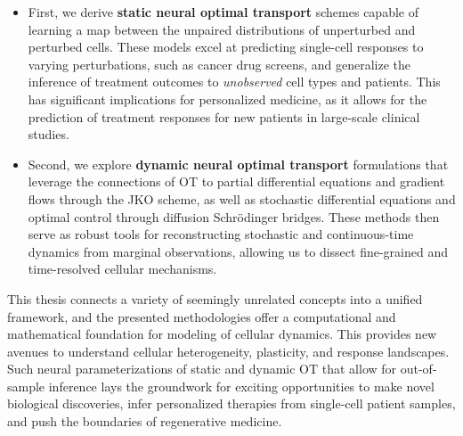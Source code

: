 \begin{itemize}[leftmargin=*]
	\item First, we derive \textbf{static neural optimal transport} schemes capable of learning a map between the unpaired distributions of unperturbed and perturbed cells. These models excel at predicting single-cell responses to varying perturbations, such as cancer drug screens, and generalize the inference of treatment outcomes to \emph{unobserved} cell types and patients.
This has significant implications for personalized medicine, as it allows for the prediction of treatment responses for new patients in large-scale clinical studies.

	\item Second, we explore \textbf{dynamic neural optimal transport} formulations that leverage the connections of OT to partial differential equations and gradient flows through the \acrfull{JKO} scheme, as well as stochastic differential equations and optimal control through diffusion Schr{\"o}dinger bridges. These methods then serve as robust tools for reconstructing stochastic and continuous-time dynamics from marginal observations, allowing us to dissect fine-grained and time-resolved cellular mechanisms.
\end{itemize}

This thesis connects a variety of seemingly unrelated concepts into a unified framework, and the presented methodologies offer a computational and mathematical foundation for modeling of cellular dynamics. This provides new avenues to understand cellular heterogeneity, plasticity, and response landscapes.
Such neural parameterizations of static and dynamic OT that allow for out-of-sample inference lays the groundwork for exciting opportunities to make novel biological discoveries, infer personalized  therapies from single-cell patient samples, and push the boundaries of regenerative medicine.

\endgroup

\cleardoublepage%

\begingroup
\let\clearpage\relax
\let\cleardoublepage\relax
\let\cleardoublepage\relax

